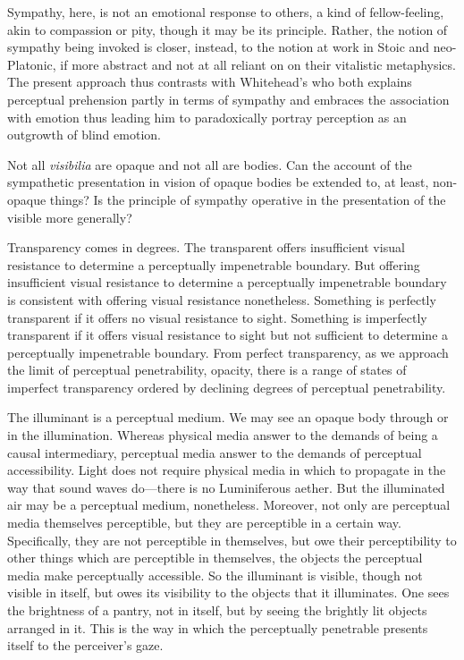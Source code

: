 \documentclass[12pt]{article}
\begin{document}
Sympathy, here, is not an emotional response to others, a kind of fellow-feeling, akin to compassion or pity, though it may be its principle. Rather, the notion of sympathy being invoked is closer, instead, to the notion at work in Stoic and neo-Platonic, if more abstract and not at all reliant on on their vitalistic metaphysics. The present approach thus contrasts with Whitehead’s who both explains perceptual prehension partly in terms of sympathy and embraces the association with emotion thus leading him to paradoxically portray perception as an outgrowth of blind emotion.

Not all \emph{visibilia} are opaque and not all are bodies. Can the account of the sympathetic presentation in vision of opaque bodies be extended to, at least, non-opaque things? Is the principle of sympathy operative in the presentation of the visible more generally?

Transparency comes in degrees. The transparent offers insufficient visual resistance to determine a perceptually impenetrable boundary. But offering insufficient visual resistance to determine a perceptually impenetrable boundary is consistent with offering visual resistance nonetheless. Something is perfectly transparent if it offers no visual resistance to sight. Something is imperfectly transparent if it offers visual resistance to sight but not sufficient to determine a perceptually impenetrable boundary. From perfect transparency, as we approach the limit of perceptual penetrability, opacity, there is a range of states of imperfect transparency ordered by declining degrees of perceptual penetrability. 

The illuminant is a perceptual medium. We may see an opaque body through or in the illumination. Whereas physical media answer to the demands of being a causal intermediary, perceptual media answer to the demands of perceptual accessibility. Light does not require physical media in which to propagate in the way that sound waves do---there is no Luminiferous aether. But the illuminated air may be a perceptual medium, nonetheless. Moreover, not only are perceptual media themselves perceptible, but they are perceptible in a certain way. Specifically, they are not perceptible in themselves, but owe their perceptibility to other things which are perceptible in themselves, the objects the perceptual media make perceptually accessible. So the illuminant is visible, though not visible in itself, but owes its visibility to the objects that it illuminates. One sees the brightness of a pantry, not in itself, but by seeing the brightly lit objects arranged in it. This is the way in which the perceptually penetrable presents itself to the perceiver's gaze.
\end{document}
